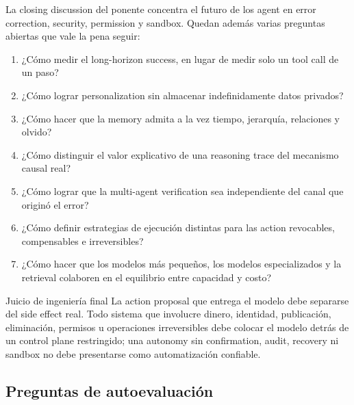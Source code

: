 La closing discussion del ponente concentra el futuro de los agent en error correction, security, permission y sandbox. Quedan además varias preguntas abiertas que vale la pena seguir:

\begin{enumerate}
  \item ¿Cómo medir el long-horizon success, en lugar de medir solo un tool call de un paso?
  \item ¿Cómo lograr personalization sin almacenar indefinidamente datos privados?
  \item ¿Cómo hacer que la memory admita a la vez tiempo, jerarquía, relaciones y olvido?
  \item ¿Cómo distinguir el valor explicativo de una reasoning trace del mecanismo causal real?
  \item ¿Cómo lograr que la multi-agent verification sea independiente del canal que originó el error?
  \item ¿Cómo definir estrategias de ejecución distintas para las action revocables, compensables e irreversibles?
  \item ¿Cómo hacer que los modelos más pequeños, los modelos especializados y la retrieval colaboren en el equilibrio entre capacidad y costo?
\end{enumerate}

\begin{warningbox}{Juicio de ingeniería final}
La action proposal que entrega el modelo debe separarse del side effect real. Todo sistema que involucre dinero, identidad, publicación, eliminación, permisos u operaciones irreversibles debe colocar el modelo detrás de un control plane restringido; una autonomy sin confirmation, audit, recovery ni sandbox no debe presentarse como automatización confiable.
\end{warningbox}

\subsection{Preguntas de autoevaluación}

